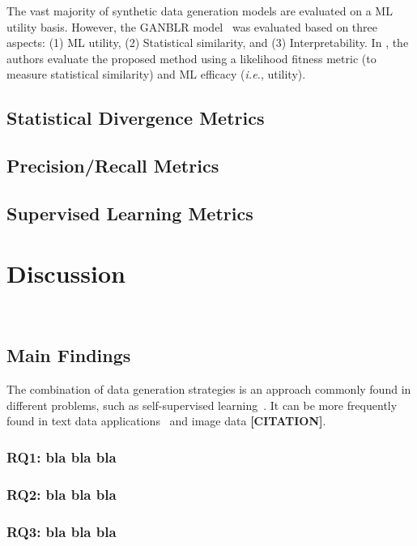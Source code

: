 \documentclass[parskip=full]{scrartcl}
\begin{document}
The vast majority of synthetic data generation models are evaluated on a ML
utility basis. However, the GANBLR model~\cite{zhang2021ganblr} was evaluated
based on three aspects: (1) ML utility, (2) Statistical similarity, and (3)
Interpretability. In \citet{xu2019modeling}, the authors evaluate the proposed
method using a likelihood fitness metric (to measure statistical similarity)
and ML efficacy (\textit{i.e.}, utility).

\subsection{Statistical Divergence Metrics} 

\subsection{Precision/Recall Metrics}

\subsection{Supervised Learning Metrics}

\section{Discussion}~\label{sec:discussion}

\subsection{Main Findings}

The combination of data generation strategies is an approach commonly found in
different problems, such as self-supervised
learning~\cite{grill2020bootstrap}. It can be more frequently found in text
data applications~\cite{bayer2021survey} and image data \textbf{[CITATION]}.

\subsubsection{RQ1: bla bla bla}

\subsubsection{RQ2: bla bla bla}

\subsubsection{RQ3: bla bla bla}
\end{document}
